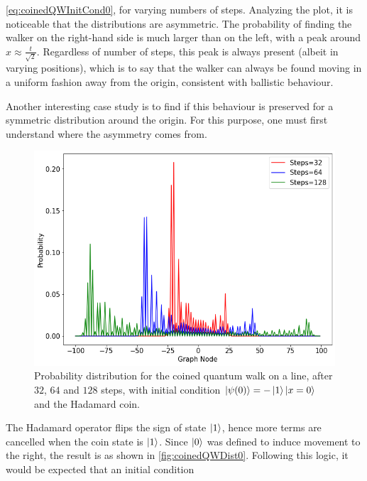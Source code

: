 \documentclass[../../dissertation.tex]{subfiles}
\begin{document}
\ref{eq:coinedQWInitCond0}, for varying numbers of steps. Analyzing the plot,
it is noticeable that the distributions are asymmetric. The probability of
finding the walker on the right-hand side is much larger than on the left, with
a peak around $x \approx \frac{t}{\sqrt{2}}$. Regardless of number of steps,
this peak is always present (albeit in varying positions), which is to say that
the walker can always be found moving in a uniform fashion away from the
origin, consistent with ballistic behaviour.\par 

Another interesting case study is to find if this behaviour is preserved for a
symmetric distribution around the origin. For this purpose, one must first
understand where the asymmetry comes from.
\begin{figure}[!h]
	\centering
	\includegraphics[scale=0.40]{img/CoinedQuantumWalk/CoinedMultiple_psi1_3264128.png}
	\caption{Probability distribution for the coined quantum walk on a line, after $32$, $64$ and $128$ steps, with initial condition $\ket{\psi(0)}=-\ket{1}\ket{x=0}$ and the Hadamard coin.} 
	\label{fig:coinedQWDist1}
\end{figure}
The Hadamard operator flips the sign of state $\ket{1}$, hence more terms are
cancelled when the coin state is $\ket{1}$. Since $\ket{0}$ was defined to
induce movement to the right, the result is as shown in
\ref{fig:coinedQWDist0}. Following this logic, it would be expected that an
initial condition 
\end{document}
